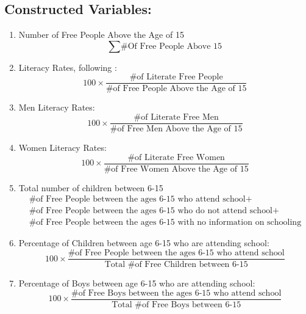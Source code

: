 \documentclass{article}
\begin{document}
\subsection{Constructed Variables:}

\begin{enumerate}
  \item Number of Free People Above the Age of 15
  $$ \sum \text{\# Of Free People Above 15} $$

  \item Literacy Rates, following \textcite{Rocha2017-yq}: 
  $$100 \times \frac{\text{\# of Literate Free People}}{\text{\# of Free People Above the Age of 15}}$$

  \item Men Literacy Rates: 
  $$100 \times \frac{\text{\# of Literate Free Men}}{\text{\# of Free Men Above the Age of 15}}$$

  \item Women Literacy Rates: 
  $$100 \times \frac{\text{\# of Literate Free Women}}{\text{\# of Free Women Above the Age of 15}} $$

  \item Total number of children between 6-15
  \begin{equation*}
    \begin{array}{l}
  \text{\# of Free People between the ages 6-15 who attend school} + \\ \text{\# of Free People between the ages 6-15 who do not attend school} + \\ \text{\# of Free People between the ages 6-15 with no information on schooling}
    \end{array}
  \end{equation*}

  \item Percentage of Children between age 6-15 who are attending school:
  \begin{equation*}
    100 \times \frac{\text{\# of Free People between the ages 6-15 who attend school}}{\text{Total \# of Free Children between 6-15}}
  \end{equation*}

  \item Percentage of Boys between age 6-15 who are attending school:
  \begin{equation*}
    100 \times \frac{\text{\# of Free Boys between the ages 6-15 who attend school}}{\text{Total \# of Free Boys between 6-15}}
  \end{equation*}


\end{enumerate}
\end{document}
